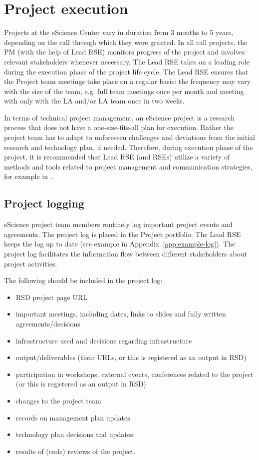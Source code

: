 \section{Project execution}
Projects at the eScience Center vary in duration from 3 months to 5 years, depending on the call through which they were
granted. In all call projects, the PM (with the help of Lead RSE) monitors progress of the project and involves
relevant stakeholders whenever necessary. The Lead RSE takes on a leading role during the execution phase of the
project life cycle. The Lead RSE ensures that the Project team meetings take place on a regular basis: the frequency
may vary with the size of the team, e.g. full team meetings once per month and meeting with only with the LA and/or LA
team once in two weeks.

In terms of technical project management, an eScience project is a research process that does not have a one-size-fits-all plan for execution. Rather the project 
team has to adapt to unforeseen challenges and deviations from the initial research and technology plan, if needed. Therefore, 
during execution phase of the project, it is recommended that Lead RSE (and RSEs) utilize a variety of methods and tools 
related to project management and communication strategies, for example in~\cite{the_turing_way-2023,microp3,scrum-guide}.

\subsection{Project logging}
\label{sec:exec:log}
eScience project team members routinely log important project events and agreements. The project log is placed in the
Project portfolio. The Lead RSE keeps the log up to
date (see example in Appendix~\ref{app:example-log}). The project log facilitates the information flow between
different stakeholders about project activities.

The following should be included in the project log:
\begin{itemize}[itemsep=-4pt,parsep=4pt]
\item RSD project page URL
\item important meetings, including dates, links to slides and fully written agreements/decisions
\item infrastructure used and decisions regarding infrastructure
\item output/deliverables (their URLs, or this is registered as an output in RSD)
\item participation in workshops, external events, conferences related to the project (or this is registered as an output in
RSD)
\item changes to the project team
\item records on management plan updates
\item technology plan decisions and updates
\item results of (code) reviews of the project.
\end{itemize}

